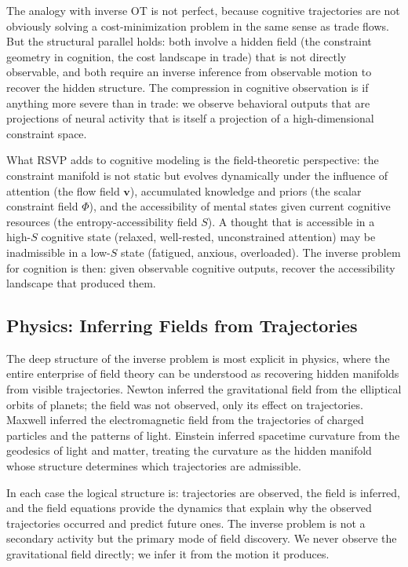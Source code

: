 \documentclass[12pt]{article}
\begin{document}
The analogy with inverse OT is not perfect, because cognitive trajectories are not obviously solving a cost-minimization problem in the same sense as trade flows. But the structural parallel holds: both involve a hidden field (the constraint geometry in cognition, the cost landscape in trade) that is not directly observable, and both require an inverse inference from observable motion to recover the hidden structure. The compression in cognitive observation is if anything more severe than in trade: we observe behavioral outputs that are projections of neural activity that is itself a projection of a high-dimensional constraint space.

What RSVP adds to cognitive modeling is the field-theoretic perspective: the constraint manifold is not static but evolves dynamically under the influence of attention (the flow field $\mathbf{v}$), accumulated knowledge and priors (the scalar constraint field $\Phi$), and the accessibility of mental states given current cognitive resources (the entropy-accessibility field $S$). A thought that is accessible in a high-$S$ cognitive state (relaxed, well-rested, unconstrained attention) may be inadmissible in a low-$S$ state (fatigued, anxious, overloaded). The inverse problem for cognition is then: given observable cognitive outputs, recover the accessibility landscape that produced them.

\subsection{Physics: Inferring Fields from Trajectories}

The deep structure of the inverse problem is most explicit in physics, where the entire enterprise of field theory can be understood as recovering hidden manifolds from visible trajectories. Newton inferred the gravitational field from the elliptical orbits of planets; the field was not observed, only its effect on trajectories. Maxwell inferred the electromagnetic field from the trajectories of charged particles and the patterns of light. Einstein inferred spacetime curvature from the geodesics of light and matter, treating the curvature as the hidden manifold whose structure determines which trajectories are admissible.

In each case the logical structure is: trajectories are observed, the field is inferred, and the field equations provide the dynamics that explain why the observed trajectories occurred and predict future ones. The inverse problem is not a secondary activity but the primary mode of field discovery. We never observe the gravitational field directly; we infer it from the motion it produces.
\end{document}
